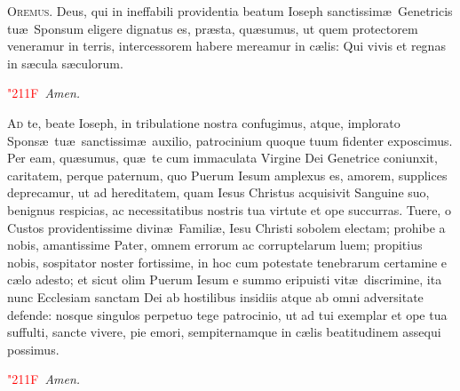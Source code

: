 \documentclass[12pt]{article}\errorcontextlines=9
\newcommand\response[1]{%
\textcolor{red}{\char"211F\ }#1%
}
\begin{document}
\begin{multicols}{2}
\bigskip

\lettrine{O}{\color{red}remus}. Deus, qui in ineffabili providentia beatum Ioseph sanctissim\ae\ Genetricis tu\ae\ 
Sponsum eligere dignatus es, pr\ae sta, qu\ae sumus, ut quem protectorem veneramur in terris, 
intercessorem habere mereamur in c\ae lis: Qui vivis et regnas in s\ae cula s\ae culorum.

\response \textit{Amen.}

\bigskip

\lettrine{A}{\color{red}d} te, beate Ioseph, in tribulatione nostra confugimus, atque, implorato Spons\ae\ tu\ae\ sanctissim\ae\ auxilio, 
patrocinium quoque tuum fidenter exposcimus. Per eam, qu\ae sumus, qu\ae\ te cum immaculata Virgine Dei Genetrice coniunxit, caritatem, 
perque paternum, quo Puerum Iesum amplexus es, amorem, supplices deprecamur, ut ad hereditatem, quam Iesus Christus acquisivit Sanguine suo, 
benignus respicias, ac necessitatibus nostris tua virtute et ope succurras. Tuere, o Custos providentissime divin\ae\ Famili\ae, 
Iesu Christi sobolem electam; prohibe a nobis, amantissime Pater, omnem errorum ac corruptelarum luem; propitius nobis, 
sospitator noster fortissime, in hoc cum potestate tenebrarum certamine e c\ae lo adesto; et sicut olim Puerum Iesum 
e summo eripuisti vit\ae\ discrimine, ita nunc Ecclesiam sanctam Dei ab hostilibus insidiis atque ab omni adversitate defende: 
nosque singulos perpetuo tege patrocinio, ut ad tui exemplar et ope tua suffulti, sancte vivere, pie emori, 
sempiternamque in c\ae lis beatitudinem assequi possimus.

\response \textit{Amen.}

\end{multicols}
\end{document}
